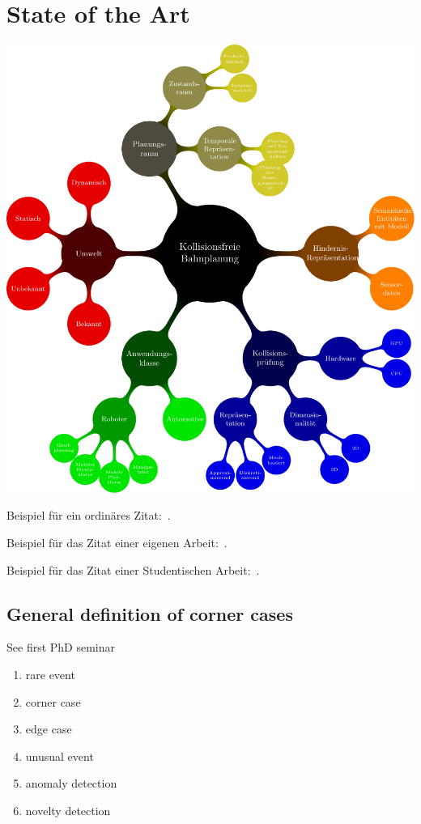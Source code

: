 \chapter{State of the Art}
\label{chap:relatedwork}

\includegraphics[width=1\textwidth]{04_images/sota_taxonomy}


Beispiel für ein ordinäres Zitat:~\cite{Schwarzer05adaptivedynamic}.

Beispiel für das Zitat einer eigenen Arbeit:~.

Beispiel für das Zitat einer Studentischen Arbeit:~.

\section{General definition of corner cases}

See first PhD seminar
\begin{enumerate}
    \item rare event
    \item corner case
    \item edge case
    \item unusual event \cite{bolte_towards_2019}
    \item anomaly detection \cite{bolte_towards_2019}
    \item novelty detection \cite{bolte_towards_2019}
\end{enumerate}

